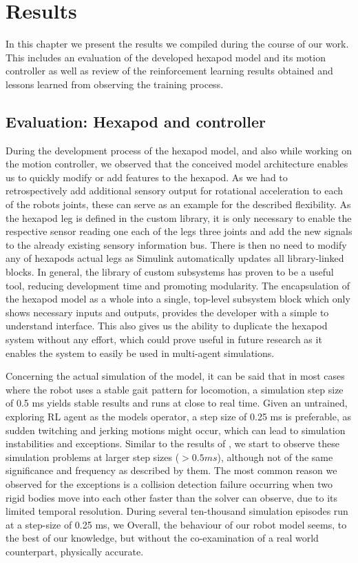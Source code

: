 \chapter{Results}
\label{ch:results}

In this chapter we present the results we compiled during the course of our work.
This includes an evaluation of the developed hexapod model and its motion controller as well as review of the reinforcement learning results obtained and lessons learned from observing the training process.

\section{Evaluation: Hexapod and controller}
During the development process of the hexapod model, and also while working on the motion controller, we observed that the conceived model architecture enables us to quickly modify or add features to the hexapod.
As we had to retrospectively add additional sensory output for rotational acceleration to each of the robots joints, these can serve as an example for the described flexibility. 
As the hexapod leg is defined in the custom library, it is only necessary to enable the respective sensor reading one each of the legs three joints and add the new signals to the already existing sensory information bus. 
There is then no need to modify any of hexapods actual legs as Simulink automatically updates all library-linked blocks.
In general, the library of custom subsystems has proven to be a useful tool, reducing development time and promoting modularity.
The encapsulation of the hexapod model as a whole into a single, top-level subsystem block which only shows necessary inputs and outputs, provides the developer with a simple to understand interface.
This also gives us the ability to duplicate the hexapod system without any effort, which could prove useful in future research as it enables the system to easily be used in multi-agent simulations.

Concerning the actual simulation of the model, it can be said that in most cases where the robot uses a stable gait pattern for locomotion, a simulation step size of 0.5 ms yields stable results and runs at close to real time.
Given an untrained, exploring RL agent as the models operator, a step size of 0.25 ms is preferable, as sudden twitching and jerking motions might occur, which can lead to simulation instabilities and exceptions.
Similar to the results of \cite{thilderkvist2015motion}, we start to observe these simulation problems at larger step sizes ($> 0.5 ms$), although not of the same significance and frequency as described by them. 
The most common reason we observed for the exceptions is a collision detection failure occurring when two rigid bodies move into each other faster than the solver can observe, due to its limited temporal resolution.
During several ten-thousand simulation episodes run at a step-size of 0.25 ms, we 
Overall, the behaviour of our robot model seems, to the best of our knowledge, but without the co-examination of a real world counterpart, physically accurate.

